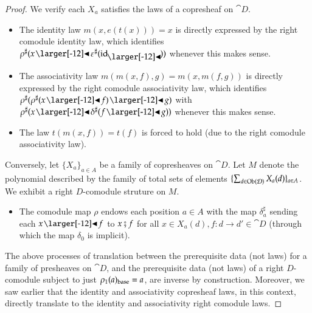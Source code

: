 \documentclass{amsart}
\begin{document}
\begin{proof}
  We verify each $X_a$ satisfies the laws of a copresheaf on $\cat{D}$.
  \begin{itemize}
  \item The identity law $m(x, e(t(x))) = x$ is directly expressed by
    the right comodule identity law, which identifies
    ${\anydirmap{\rho}{x \subd \anydirmap{\varepsilon}{\idsubd}}}$
    whenever this makes sense.
  \item The associativity law $m(m(x, f), g) = m(x, m(f, g))$ is
    directly expressed by the right comodule associativity law, which
    identifies
    ${\anydirmap{\rho}{\anydirmap{\rho}{x \subd f} \subd g}}$ with
    ${\anydirmap{\rho}{x \subd \anydirmap{\delta}{f \subd g}}}$ whenever this makes sense.
  \item The law $t(m(x, f)) = t(f)$ is forced to hold (due to the
    right comodule associativity law).
  \end{itemize}

  Conversely, let $\{X_a\}_{a \in A}$ be a family of copresheaves on
  $\cat{D}$. Let $M$ denote the polynomial described by the family of
  total sets of elements
  $\{\sum_{d \in \operatorname{Ob}(\mathcal{D})}X_a(d)\}_{a \in A}$. We exhibit a right
  $D$-comodule struture on $M$.
  \begin{itemize}
  \item The comodule map $\rho$ endows each position $a \in A$ with
    the map $\delta^\sharp_a$ sending each $x \subd f$ to
    $x \fatsemi f$ for all $x \in X_a(d), f: d \to d' \in \cat{D}$
    (through which the map $\delta_0$ is implicit).
  \end{itemize}

  The above processes of translation between the prerequisite data
  (not laws) for a family of presheaves on $\cat{D}$, and the
  prerequisite data (not laws) of a right $D$-comodule subject to just
  ${\rho}_1(a)_{\mathrm{base}} = a$, are inverse by
  construction. Moreover, we saw earlier that the identity and
  associativity copresheaf laws, in this context, directly translate
  to the identity and associativity right comodule laws.
\end{proof}
\end{document}
